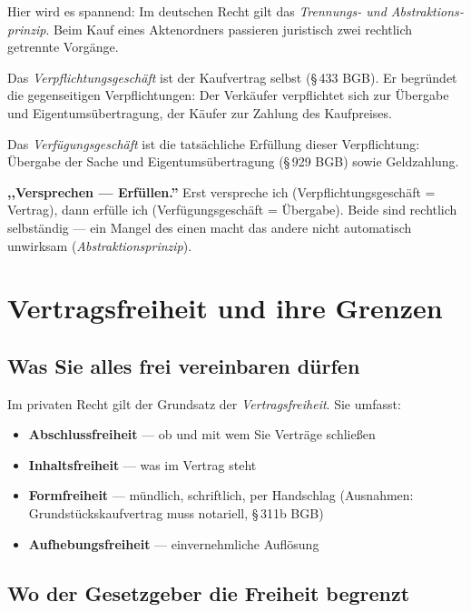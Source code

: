 \documentclass[11pt, a4paper]{article}
\begin{document}
Hier wird es spannend: Im deutschen Recht gilt das \emph{Trennungs- und Abstraktions­
prinzip}. Beim Kauf eines Aktenordners passieren juristisch zwei rechtlich getrennte
Vorgänge.

Das \emph{Verpflichtungs­geschäft} ist der Kaufvertrag selbst (§\,433 BGB). Er begründet
die gegenseitigen Verpflichtungen: Der Verkäufer verpflichtet sich zur Übergabe und
Eigentums­übertragung, der Käufer zur Zahlung des Kaufpreises.

Das \emph{Verfügungs­geschäft} ist die tatsächliche Erfüllung dieser Verpflichtung:
Übergabe der Sache und Eigentumsübertragung (§\,929 BGB) sowie Geldzahlung.

\begin{eselsbruecke}
\textbf{,,Versprechen --- Erfüllen.''} Erst verspreche ich (Verpflichtungs­geschäft =
Vertrag), dann erfülle ich (Verfügungs­geschäft = Übergabe). Beide sind rechtlich
selbständig --- ein Mangel des einen macht das andere nicht automatisch unwirksam
(\emph{Abstraktions­prinzip}).
\end{eselsbruecke}

\section{Vertragsfreiheit und ihre Grenzen}

\subsection{Was Sie alles frei vereinbaren dürfen}

Im privaten Recht gilt der Grundsatz der \emph{Vertragsfreiheit}. Sie umfasst:

\begin{itemize}[itemsep=0pt]
  \item \textbf{Abschlussfreiheit} --- ob und mit wem Sie Verträge schließen
  \item \textbf{Inhaltsfreiheit} --- was im Vertrag steht
  \item \textbf{Formfreiheit} --- mündlich, schriftlich, per Handschlag (Ausnahmen: Grundstückskaufvertrag muss notariell, §\,311b BGB)
  \item \textbf{Aufhebungsfreiheit} --- einvernehmliche Auflösung
\end{itemize}

\subsection{Wo der Gesetzgeber die Freiheit begrenzt}
\end{document}
